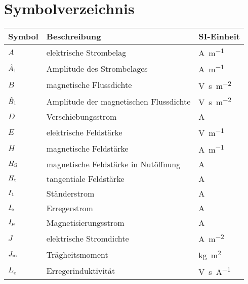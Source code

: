 

\chapter*{Symbolverzeichnis}\label{s.sym}
\begin{flushleft}
\begin{tabularx}{\textwidth}{lll}
\toprule
Symbol & Beschreibung	& SI-Einheit\\
\midrule
$A$			&	elektrische Strombelag  	&  	\si{\ampere\per\meter} \\
$\hat{A}_{\mathrm{1}}$			&	Amplitude des Strombelages  	&  	\si{\ampere\per\meter} \\ 
$B$			&	magnetische Flussdichte		&	\si{\volt\second\per\square\meter} \\
$\hat{B}_{\mathrm{1}}$	 &	Amplitude der magnetischen Flussdichte 	&  	\si{\volt\second\per\square\meter} \\ 
$D$ & Verschiebungsstrom &  \si{\ampere} \\
$E$ & elektrische Feldstärke & \si{\volt\per\meter} \\
$H$			&	magnetische Feldstärke		&	\si{\ampere\per\meter}\\
$H_{\mathrm{S}}$	&   magnetische Feldstärke in Nutöffnung	&	\si{\ampere} \\
$H_{\mathrm{t}}$	&   tangentiale Feldstärke	&	\si{\ampere} \\
$I_{\mathrm{1}}$	&	Ständerstrom	&	\si{\ampere} \\
$I_{\mathrm{e}}$	&	Erregerstrom	&	\si{\ampere} \\
$I_{\mathrm{\mu}}$	&	Magnetisierungsstrom	&	\si{\ampere} \\
$J$			&	elektrische Stromdichte		&	\si{\ampere\per\square\meter} \\
$J_{\mathrm{m}}$			&	Trägheitsmoment	&	\si{\kilogram\square\meter} \\
$L_\mathrm{e}$	& 	Erregerinduktivität & \si{\volt\second\per\ampere}\\

\end{tabularx}
\end{flushleft}
